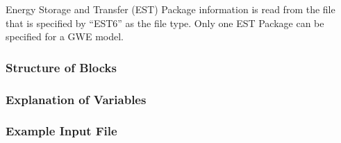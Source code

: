 Energy Storage and Transfer (EST) Package information is read from the file that is specified by ``EST6'' as the file type.  Only one EST Package can be specified for a GWE model. 

\vspace{5mm}
\subsubsection{Structure of Blocks}



\vspace{5mm}
\subsubsection{Explanation of Variables}
\begin{description}

\end{description}

\vspace{5mm}
\subsubsection{Example Input File}


